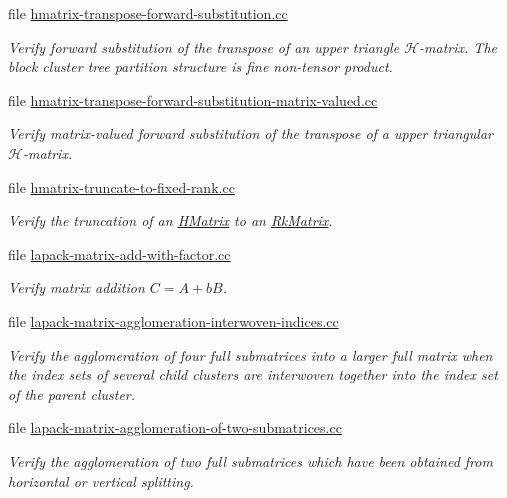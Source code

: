 \begin{DoxyCompactItemize}
file \hyperlink{hmatrix-transpose-forward-substitution_8cc}{hmatrix-\/transpose-\/forward-\/substitution.\+cc}
\begin{DoxyCompactList}\small\item\em Verify forward substitution of the transpose of an upper triangle $\mathcal{H}$-\/matrix. The block cluster tree partition structure is fine non-\/tensor product. \end{DoxyCompactList}\item 
file \hyperlink{hmatrix-transpose-forward-substitution-matrix-valued_8cc}{hmatrix-\/transpose-\/forward-\/substitution-\/matrix-\/valued.\+cc}
\begin{DoxyCompactList}\small\item\em Verify matrix-\/valued forward substitution of the transpose of a upper triangular $\mathcal{H}$-\/matrix. \end{DoxyCompactList}\item 
file \hyperlink{hmatrix-truncate-to-fixed-rank_8cc}{hmatrix-\/truncate-\/to-\/fixed-\/rank.\+cc}
\begin{DoxyCompactList}\small\item\em Verify the truncation of an \hyperlink{classHMatrix}{H\+Matrix} to an \hyperlink{classRkMatrix}{Rk\+Matrix}. \end{DoxyCompactList}\item 
file \hyperlink{lapack-matrix-add-with-factor_8cc}{lapack-\/matrix-\/add-\/with-\/factor.\+cc}
\begin{DoxyCompactList}\small\item\em Verify matrix addition $C = A + b B$. \end{DoxyCompactList}\item 
file \hyperlink{lapack-matrix-agglomeration-interwoven-indices_8cc}{lapack-\/matrix-\/agglomeration-\/interwoven-\/indices.\+cc}
\begin{DoxyCompactList}\small\item\em Verify the agglomeration of four full submatrices into a larger full matrix when the index sets of several child clusters are interwoven together into the index set of the parent cluster. \end{DoxyCompactList}\item 
file \hyperlink{lapack-matrix-agglomeration-of-two-submatrices_8cc}{lapack-\/matrix-\/agglomeration-\/of-\/two-\/submatrices.\+cc}
\begin{DoxyCompactList}\small\item\em Verify the agglomeration of two full submatrices which have been obtained from horizontal or vertical splitting. \end{DoxyCompactList}\item 

\end{DoxyCompactItemize}
